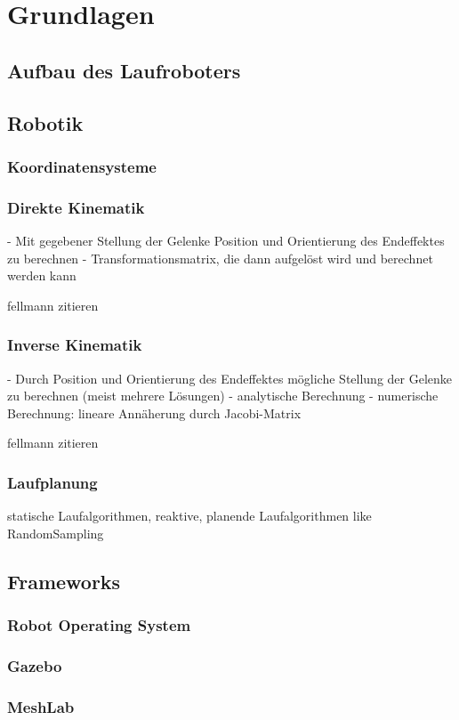 \chapter{Grundlagen}
\label{kap2}

\section{Aufbau des Laufroboters}

\section{Robotik}

\subsection{Koordinatensysteme}
\subsection{Direkte Kinematik}

- Mit gegebener Stellung der Gelenke Position und Orientierung des Endeffektes zu berechnen
- Transformationsmatrix, die dann aufgelöst wird und berechnet werden kann

fellmann zitieren

\subsection{Inverse Kinematik}

- Durch Position und Orientierung des Endeffektes mögliche Stellung der Gelenke zu berechnen (meist mehrere Lösungen)
- analytische Berechnung
- numerische Berechnung: lineare Annäherung durch Jacobi-Matrix

fellmann zitieren

\subsection{Laufplanung}

statische Laufalgorithmen, reaktive, planende Laufalgorithmen like RandomSampling

\section{Frameworks}

\subsection{Robot Operating System}
\subsection{Gazebo}
\subsection{MeshLab}